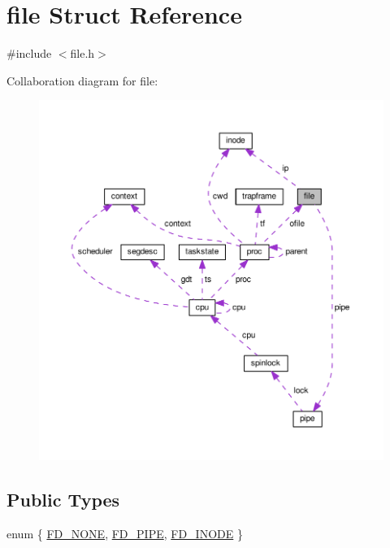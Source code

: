 \hypertarget{structfile}{\section{file Struct Reference}
\label{structfile}
}


{\ttfamily \#include $<$file.\-h$>$}



Collaboration diagram for file\-:
\nopagebreak
\begin{figure}[H]
\begin{center}
\leavevmode
\includegraphics[width=350pt]{structfile__coll__graph}
\end{center}
\end{figure}
\subsection*{Public Types}
\begin{DoxyCompactItemize}
\item 
enum \{ \hyperlink{structfile_adc29c2ff13d900c2f185ee95427fb06ca949fd72b27639c27329b150ec9de33cd}{F\-D\-\_\-\-N\-O\-N\-E}, 
\hyperlink{structfile_adc29c2ff13d900c2f185ee95427fb06caab625bb8391962abb9337db42d7909d6}{F\-D\-\_\-\-P\-I\-P\-E}, 
\hyperlink{structfile_adc29c2ff13d900c2f185ee95427fb06ca45efb38f6972a89c2237550ef6cd542c}{F\-D\-\_\-\-I\-N\-O\-D\-E}
 \}
\end{DoxyCompactItemize}
